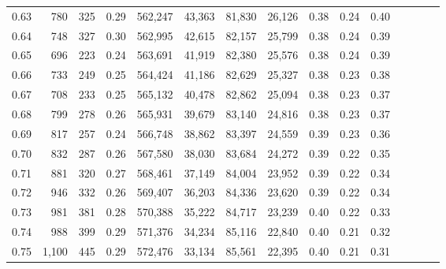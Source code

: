 \begin{tabular}{rrrcrrrrrrrrrrr}
0.63 &     780 &    325 &                                       0.29 &  562,247 &   43,363 &   81,830 &   26,126 &  0.38 &  0.24 &                         0.40 \\
0.64 &     748 &    327 &                                       0.30 &  562,995 &   42,615 &   82,157 &   25,799 &  0.38 &  0.24 &                         0.39 \\
0.65 &     696 &    223 &                                       0.24 &  563,691 &   41,919 &   82,380 &   25,576 &  0.38 &  0.24 &                         0.39 \\
0.66 &     733 &    249 &                                       0.25 &  564,424 &   41,186 &   82,629 &   25,327 &  0.38 &  0.23 &                         0.38 \\
0.67 &     708 &    233 &                                       0.25 &  565,132 &   40,478 &   82,862 &   25,094 &  0.38 &  0.23 &                         0.37 \\
0.68 &     799 &    278 &                                       0.26 &  565,931 &   39,679 &   83,140 &   24,816 &  0.38 &  0.23 &                         0.37 \\
0.69 &     817 &    257 &                                       0.24 &  566,748 &   38,862 &   83,397 &   24,559 &  0.39 &  0.23 &                         0.36 \\
0.70 &     832 &    287 &                                       0.26 &  567,580 &   38,030 &   83,684 &   24,272 &  0.39 &  0.22 &                         0.35 \\
0.71 &     881 &    320 &                                       0.27 &  568,461 &   37,149 &   84,004 &   23,952 &  0.39 &  0.22 &                         0.34 \\
0.72 &     946 &    332 &                                       0.26 &  569,407 &   36,203 &   84,336 &   23,620 &  0.39 &  0.22 &                         0.34 \\
0.73 &     981 &    381 &                                       0.28 &  570,388 &   35,222 &   84,717 &   23,239 &  0.40 &  0.22 &                         0.33 \\
0.74 &     988 &    399 &                                       0.29 &  571,376 &   34,234 &   85,116 &   22,840 &  0.40 &  0.21 &                         0.32 \\
0.75 &   1,100 &    445 &                                       0.29 &  572,476 &   33,134 &   85,561 &   22,395 &  0.40 &  0.21 &                         0.31 \\

\end{tabular}
